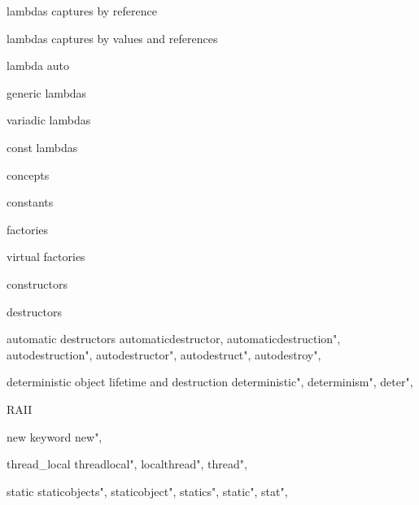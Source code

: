          lambdas captures by reference 
        
         lambdas captures by values and references 
        
         lambda auto
        
         generic lambdas
        
         variadic lambdas 
        
         const lambdas 
        
         concepts 
        
         constants 
        
         factories 
        
         virtual factories 
        
         constructors 
        
         destructors
        
         automatic destructors 
        automaticdestructor,  
        automaticdestruction", 
        autodestruction",  
        autodestructor",  
        autodestruct",  
        autodestroy",  
        
         deterministic object lifetime and destruction
        deterministic",  
        determinism",  
        deter",  
        
         RAII 
        
         new keyword 
        new",
        
         thread_local
        threadlocal",
        localthread",
        thread",
        
         static 
        staticobjects",
        staticobject",
        statics",
        static",
        stat", 
        
